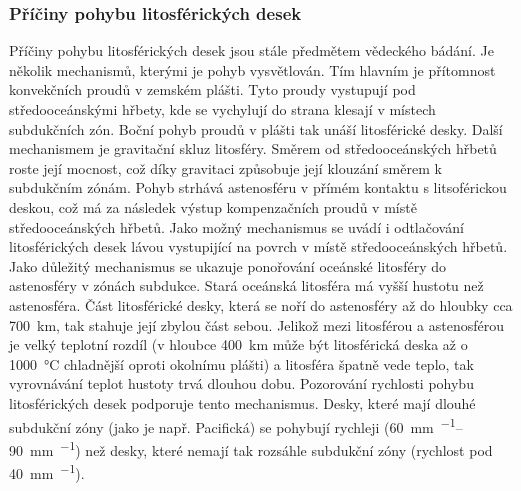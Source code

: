 \subsubsection{Příčiny pohybu litosférických desek}
Příčiny pohybu litosférických desek jsou stále předmětem vědeckého bádání. Je několik mechanismů, kterými je pohyb vysvětlován. Tím hlavním je přítomnost konvekčních proudů v zemském plášti. Tyto proudy vystupují pod středooceánskými hřbety, kde se vychylují do strana klesají v místech subdukčních zón. Boční pohyb proudů v plášti tak unáší litosférické desky. Další mechanismem je gravitační skluz litosféry. Směrem od středooceánských hřbetů roste její mocnost, což díky gravitaci způsobuje její klouzání směrem k subdukčním zónám. Pohyb strhává astenosféru v přímém kontaktu s litsoférickou deskou, což má za následek výstup kompenzačních proudů v místě středooceánských hřbetů. Jako možný mechanismus se uvádí i odtlačování litosférických desek lávou vystupijící na povrch v místě středooceánských hřbetů. Jako důležitý mechanismus se ukazuje ponořování oceánské litosféry do astenosféry v zónách subdukce. Stará oceánská litosféra má vyšší hustotu než astenosféra. Část litosférické desky, která se noří do astenosféry až do hloubky cca \SI{700}{\kilo\metre}, tak stahuje její zbylou část sebou. Jelikož mezi litosférou a astenosférou je velký teplotní rozdíl (v hloubce \SI{400}{\kilo\metre} může být litosférická deska až o \SI{1000}{\degreeCelsius} chladnější oproti okolnímu plášti) a litosféra špatně vede teplo, tak vyrovnávání teplot hustoty trvá dlouhou dobu. Pozorování rychlosti pohybu litosférických desek podporuje tento mechanismus. Desky, které mají dlouhé subdukční zóny (jako je např. Pacifická) se pohybují rychleji (\SIrange{60}{90}{\milli\metre\per\rok}) než desky, které nemají tak rozsáhle subdukční zóny (rychlost pod \SI{40}{\milli\metre\per\rok}).

